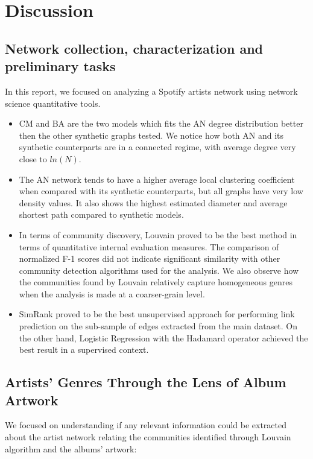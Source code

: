 \documentclass[sigchi]{acmart}
\begin{document}
\section{Discussion}

\subsection{Network collection, characterization and preliminary tasks}
In this report, we focused on analyzing a Spotify artists network using network science quantitative tools.

\begin{itemize}
    
\item CM and BA are the two models which fits the AN degree distribution better then the other synthetic graphs tested. We notice how both AN and its synthetic counterparts are in a connected regime, with average degree very close to $ln(N)$.
\item The AN network tends to have a higher average local clustering coefficient when compared with its synthetic counterparts, but all graphs have very low density values. It also shows the highest estimated diameter and average shortest path compared to synthetic models.
\item In terms of community discovery, Louvain proved to be the best method in terms of quantitative internal evaluation measures. The comparison of normalized F-1 scores did not indicate significant similarity with other community detection algorithms used for the analysis. We also observe how the communities found by Louvain relatively capture homogeneous genres when the analysis is made at a coarser-grain level.
\item SimRank proved to be the best unsupervised approach for performing link prediction on the sub-sample of edges extracted from the main dataset. On the other hand, Logistic Regression with the Hadamard operator achieved the best result in a supervised context.

\end{itemize}

\subsection{Artists’ Genres Through the Lens of Album Artwork}
We focused on understanding if any relevant information could be extracted about the artist network relating the communities identified through Louvain algorithm and the albums' artwork: 
\end{document}
